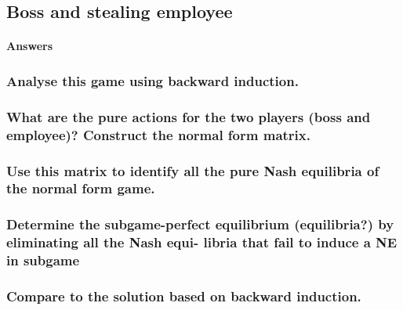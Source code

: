 \subsection{Boss and stealing employee}

\paragraph{Answers}
\subsubsection{Analyse this game using backward induction.}

\subsubsection{What are the pure actions for the two players (boss and employee)? Construct the normal
form matrix.}

\subsubsection{Use this matrix to identify all the pure Nash equilibria of the normal form game.}

\subsubsection{Determine the subgame-perfect equilibrium (equilibria?) by eliminating all the Nash equi-
libria that fail to induce a NE in subgame}

\subsubsection{Compare to the solution based on backward induction.}